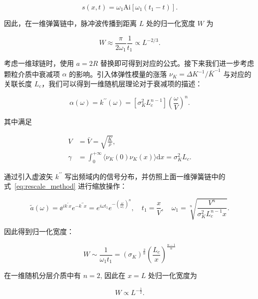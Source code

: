 \begin{equation}
  s(x,t) = \omega_{1}\text{Ai}\left[\omega_{1}(t_{1}-t)\right].
\end{equation}

因此，在一维弹簧链中，脉冲波传播到距离 $L$ 处的归一化宽度 $W$ 为

\begin{equation}
  W \approx \frac{\pi}{2\omega_{1}}\frac{1}{t_{1}}\propto L^{-2/3}.
\end{equation}

考虑一维球链时，使用 $a=2R$ 替换即可得到对应的公式\cite{PhysRevE.91.022205}。接下来我们进一步考虑颗粒介质中衰减项 $\alpha$ 的影响。引入体弹性模量的涨落 $\nu_{K} = \Delta K^{-1}/\bar{K}^{-1}$ 与对应的关联长度 $L_{c}$，我们可以得到一维随机层理论对于衰减项的描述\cite{fouqueWavePropagationTime2007}：

\begin{equation}
  \alpha(\omega) = k^{\prime\prime}(\omega) = [\sigma_{K}^{2}L_{c}^{n-1}]\left(\frac{\omega}{V}\right)^{n}.
\end{equation}

其中满足

\begin{align}
  V &= \bar{V} = \sqrt{\frac{\bar{K}}{\bar{\rho}}},\\
  \gamma &= \int_{0}^{+\infty}\langle\nu_{K}(0)\nu_{K}(x)\rangle\mathrm{d}x = \sigma_{K}^{2}L_{c}.
\end{align}

通过引入虚波矢 $k^{\prime\prime}$ 写出频域内的信号分布，并仿照上面一维弹簧链中的式~\eqref{eq:rescale_method} 进行缩放操作：

\begin{equation}
  \widetilde{a}(\omega) = {\ee}^{ik^{\prime}x}e^{-k^{\prime\prime}x} = e^{i\omega t_{1}}e^{-\left(\frac{\omega}{\omega_{1}}\right)^{n}},\quad t_{1} = \frac{x}{V},\quad \omega_{1} = \sqrt[n]{\frac{V^{n}}{\sigma_{K}^{2}L_{c}^{n-1}x}}.
\end{equation}

因此得到归一化宽度：

\begin{equation}
W\sim \frac{1}{\omega_{1}t_{1}} = (\sigma_{K})^{\frac{2}{n}}\left(\frac{L_{c}}{x}\right)^{\frac{n-1}{n}}
\end{equation}

在一维随机分层介质中有 $n=2$, 因此在 $x = L$ 处归一化宽度为

\begin{equation}
  W\propto L^{-\frac{1}{2}}.
\end{equation}

